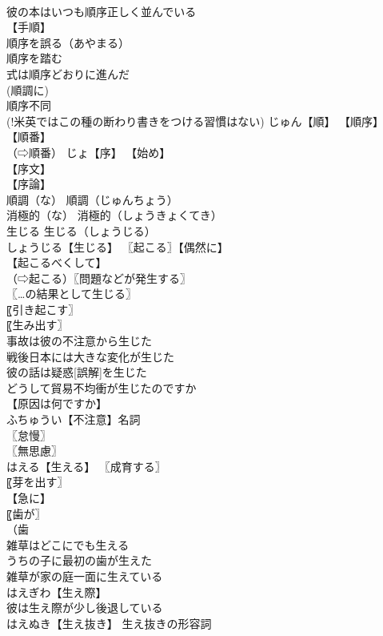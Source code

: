 \documentclass[8pt]{extreport}
\begin{document}
\begin{CJK}{UTF8}{min}
\\	彼の本はいつも順序正しく並んでいる 
\\	【手順】 
\\	順序を誤る（あやまる） 
\\	順序を踏む 
\\	式は順序どおりに進んだ 
\\	(順調に) 
\\	順序不同 
\\	(!米英ではこの種の断わり書きをつける習慣はない) じゅん【順】 【順序】
\\	【順番】
\\	（⇨順番） じょ【序】 【始め】
\\	【序文】
\\	【序論】
\\	順調（な）		順調（じゅんちょう） 
\\	消極的（な）		消極的（しょうきょくてき） 
\\	生じる		生じる（しょうじる） 
\\	しょうじる【生じる】 〖起こる〗【偶然に】
\\	【起こるべくして】
\\	（⇨起こる）〖問題などが発生する〗
\\	〖…の結果として生じる〗
\\	〖引き起こす〗
\\	〖生み出す〗
\\	事故は彼の不注意から生じた 
\\	戦後日本には大きな変化が生じた 
\\	彼の話は疑惑[誤解]を生じた 
\\	どうして貿易不均衝が生じたのですか 
\\	【原因は何ですか】
\\	ふちゅうい【不注意】名詞 
\\	〖怠慢〗
\\	〖無思慮〗
\\	はえる【生える】 〖成育する〗
\\	〖芽を出す〗
\\	【急に】
\\	〖歯が〗
\\	（歯
\\	雑草はどこにでも生える 
\\	うちの子に最初の歯が生えた 
\\	雑草が家の庭一面に生えている 
\\	はえぎわ【生え際】 
\\	彼は生え際が少し後退している 
\\	はえぬき【生え抜き】 生え抜きの形容詞 

\end{CJK}
\end{document}
